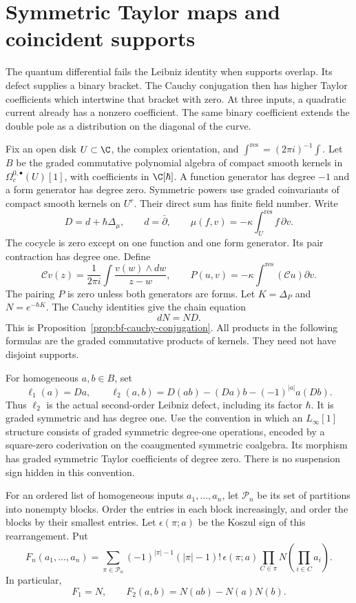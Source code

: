 \section{Symmetric Taylor maps and coincident supports}
\label{sec:current-symmetric-taylor}

The quantum differential fails the Leibniz identity when supports overlap.
Its defect supplies a binary bracket.  The Cauchy conjugation then has
higher Taylor coefficients which intertwine that bracket with zero.
At three inputs, a quadratic current already has a nonzero coefficient.
The same binary coefficient extends the double pole as a distribution
on the diagonal of the curve.

Fix an open disk $U\subset\C$, the complex orientation, and
$\int^{\mathrm{res}}=(2\pi i)^{-1}\int$.
Let $B$ be the graded commutative polynomial algebra of compact smooth
kernels in $\Omega_c^{0,\bullet}(U)[1]$, with coefficients in
$\C[\hbar]$.  A function generator has degree $-1$ and a form
generator has degree zero.  Symmetric powers use graded coinvariants
of compact smooth kernels on $U^r$.  Their direct sum has finite
field number.  Write
\[
 D=d+\hbar\Delta_\mu,\qquad d=\bar\partial,
 \qquad \mu(f,v)=-\kappa\int_U^{\mathrm{res}}f\,\partial v.
\]
The cocycle is zero except on one function and one form generator.
Its pair contraction has degree one.  Define
\[
 \mathscr C v(z)=\frac1{2\pi i}\int
                    \frac{v(w)\wedge dw}{z-w},\qquad
 P(u,v)=-\kappa\int^{\mathrm{res}}(\mathscr C u)\partial v.
\]
The pairing $P$ is zero unless both generators are forms.
Let $K=\Delta_P$ and $N=e^{-\hbar K}$.
The Cauchy identities give the chain equation
\[
 dN=ND.
\]
This is Proposition~\ref{prop:bf-cauchy-conjugation}.
All products in the following formulas are the graded commutative
products of kernels.  They need not have disjoint supports.

For homogeneous $a,b\in B$, set
\[
 \ell_1(a)=Da,\qquad
 \ell_2(a,b)=D(ab)-(Da)b-(-1)^{|a|}a(Db).
\]
Thus $\ell_2$ is the actual second-order Leibniz defect, including
its factor $\hbar$.  It is graded symmetric and has degree one.
Use the convention in which an $L_\infty[1]$ structure consists
of graded symmetric degree-one operations, encoded by a square-zero
coderivation on the coaugmented symmetric coalgebra.
Its morphism has graded symmetric Taylor coefficients of degree zero.
There is no suspension sign hidden in this convention.

For an ordered list of homogeneous inputs $a_1,\ldots,a_n$, let
$\mathcal P_n$ be its set of partitions into nonempty blocks.
Order the entries in each block increasingly, and order the blocks
by their smallest entries.  Let $\epsilon(\pi;a)$ be the Koszul
sign of this rearrangement.  Put
\begin{equation}
\label{eq:current-cumulant-taylor}
 F_n(a_1,\ldots,a_n)=
 \sum_{\pi\in\mathcal P_n}
 (-1)^{|\pi|-1}(|\pi|-1)!\,\epsilon(\pi;a)
 \prod_{C\in\pi}N\!\left(\prod_{i\in C}a_i\right).
\end{equation}
In particular,
\[
 F_1=N,\qquad F_2(a,b)=N(ab)-N(a)N(b).
\]

